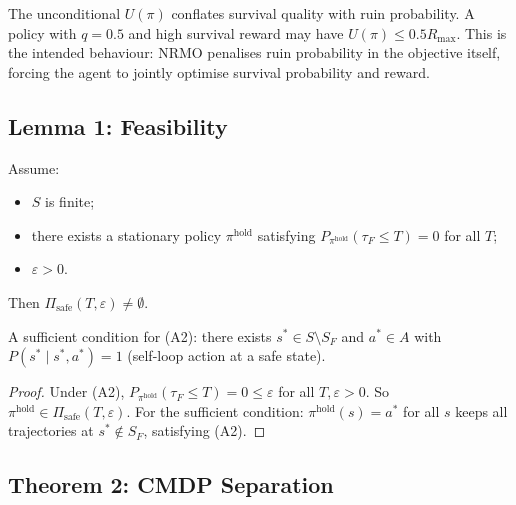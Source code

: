\begin{remark}
\label{rem:arxiv-thm1-conditional}
The unconditional $U(\pi)$ conflates survival quality with ruin
probability. A policy with $q = 0.5$ and high survival reward may
have $U(\pi) \le 0.5 R_{\max}$. This is the intended behaviour:
NRMO penalises ruin probability in the objective itself, forcing the
agent to jointly optimise survival probability and reward.
\end{remark}

\subsection{Lemma 1: Feasibility}
\label{sec:arxiv-lemma-1}

\begin{lemma}
\label{lem:arxiv-feasibility}
Assume:
\begin{itemize}
\item[(A1)] $S$ is finite;
\item[(A2)] there exists a stationary policy $\pi^{\mathrm{hold}}$
satisfying $P_{\pi^{\mathrm{hold}}}(\tau_F \le T) = 0$ for all $T$;
\item[(A3)] $\varepsilon > 0$.
\end{itemize}
Then $\Pi_{\mathrm{safe}}(T, \varepsilon) \ne \emptyset$.

A sufficient condition for (A2): there exists $s^* \in S \setminus
S_F$ and $a^* \in A$ with $P(s^* \mid s^*, a^*) = 1$ (self-loop
action at a safe state).
\end{lemma}

\begin{proof}
Under (A2), $P_{\pi^{\mathrm{hold}}}(\tau_F \le T) = 0 \le
\varepsilon$ for all $T, \varepsilon > 0$. So
$\pi^{\mathrm{hold}} \in \Pi_{\mathrm{safe}}(T, \varepsilon)$. For
the sufficient condition: $\pi^{\mathrm{hold}}(s) = a^*$ for all $s$
keeps all trajectories at $s^* \notin S_F$, satisfying (A2).
\end{proof}

\subsection{Theorem 2: CMDP Separation}
\label{sec:arxiv-thm-2}


